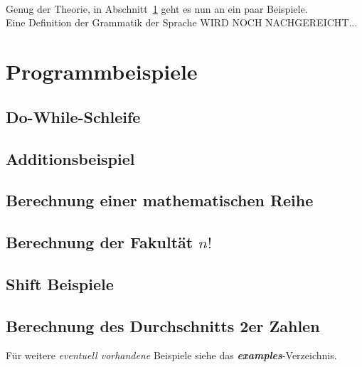 \documentclass{article}
\begin{document}
\\\\
\\Genug der Theorie, in Abschnitt~\ref{sec:examples} geht es nun an ein paar Beispiele.\\
Eine Definition der Grammatik der Sprache WIRD NOCH NACHGEREICHT...\\

\section{Programmbeispiele}
\label{sec:examples}
\subsection{Do-While-Schleife}


\subsection{Additionsbeispiel}


\newpage
\subsection{Berechnung einer mathematischen Reihe}

\newpage
\subsection{Berechnung der Fakultät $n!$}

\newpage
\subsection{Shift Beispiele}

\newpage
\subsection{Berechnung des Durchschnitts 2er Zahlen}


Für weitere \textit{eventuell vorhandene} Beispiele siehe das \textit{\textbf{examples}}-Verzeichnis.
\end{document}
